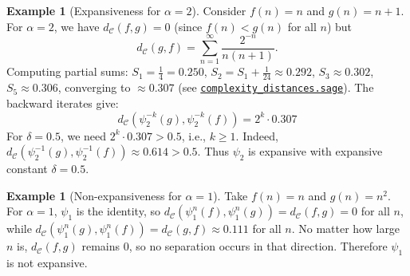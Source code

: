 \documentclass[11pt,a4paper]{article}
\newcommand{\repourl}{https://github.com/gabayae/expansive-homeomorphisms-complexity-qmetric}
\theoremstyle{plain}
\theoremstyle{definition}
\newtheorem{exampleinner}[theoreminner]{Example}
\newenvironment{example}[1][]{\begin{exampleinner}[#1]}{\end{exampleinner}}
\newcommand{\C}{\mathcal{C}}
\begin{document}
\begin{example}[Expansiveness for $\alpha=2$]\label{ex:expansive-alpha2}
Consider $f(n)=n$ and $g(n)=n+1$. For $\alpha=2$, we have $d_\C(f,g)=0$
(since $f(n)<g(n)$ for all $n$) but
\[
  d_\C(g,f)=\sum_{n=1}^\infty
  \frac{2^{-n}}{n(n+1)}.
\]
Computing partial sums: $S_1=\frac{1}{4}=0.250$,
$S_2=S_1+\frac{1}{24}\approx 0.292$,
$S_3\approx 0.302$, $S_5\approx 0.306$, converging to
$\approx 0.307$
(see \href{\repourl/blob/main/code/sagemath/complexity_distances.sage}{\texttt{complexity\_distances.sage}}).
The backward iterates give:
\[
d_\C(\psi_2^{-k}(g),\psi_2^{-k}(f)) = 2^k \cdot 0.307
\]
For $\delta=0.5$, we need $2^k \cdot 0.307 > 0.5$, i.e., $k \geq 1$.
Indeed, $d_\C(\psi_2^{-1}(g),\psi_2^{-1}(f)) \approx 0.614 > 0.5$.
Thus $\psi_2$ is expansive with expansive constant $\delta=0.5$.
\end{example}

\begin{example}[Non-expansiveness for $\alpha=1$]\label{ex:non-expansive-alpha1}
Take $f(n)=n$ and $g(n)=n^2$. For $\alpha=1$, $\psi_1$ is the identity, 
so $d_\C(\psi_1^n(f),\psi_1^n(g)) = d_\C(f,g)=0$ for all $n$, 
while $d_\C(\psi_1^n(g),\psi_1^n(f)) = d_\C(g,f)\approx 0.111$ for all $n$.
No matter how large $n$ is, $d_\C(f,g)$ remains $0$, so no separation occurs 
in that direction. Therefore $\psi_1$ is not expansive.
\end{example}
\end{document}
